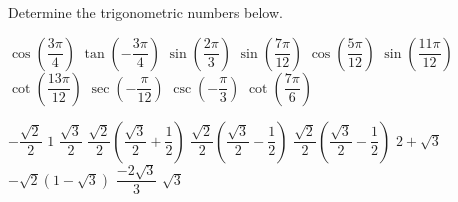 \begin{Exercise} Determine the trigonometric numbers below.
	\begin{multicols}{3}
	\Question[difficulty = 1] $\cos\left(\dfrac{3\pi}{4}\right)$
	\Question[difficulty = 1] $\tan\left(-\dfrac{3\pi}{4}\right)$
	\Question[difficulty = 1] $\sin\left(\dfrac{2\pi}{3}\right)$
	\Question[difficulty = 2] $\sin\left(\dfrac{7\pi}{12}\right)$
	\Question[difficulty = 2] $\cos\left(\dfrac{5\pi}{12}\right)$
	\Question[difficulty = 2] $\sin\left(\dfrac{11\pi}{12}\right)$
    \Question[difficulty = 2] $\cot \left(\dfrac{13\pi}{12}\right)$ 
    \Question[difficulty = 2] $\sec\left(-\dfrac{\pi}{12}\right)$ 
    \Question[difficulty = 1] $\csc\left(-\dfrac{\pi}{3}\right)$ 
    \Question[difficulty = 1] $\cot\left(\dfrac{7\pi}{6}\right)$ 
	\EndCurrentQuestion
	\end{multicols}
	
\end{Exercise}

\begin{Answer}\phantom{}
    \begin{multicols}{2}
	
	\Question $-\dfrac{\sqrt{2}}{2}$
	\Question $1$
	\Question $\dfrac{\sqrt{3}}{2}$
	\Question $\dfrac{\sqrt{2}}{2} \left(\dfrac{\sqrt{3}}{2} + \dfrac{1}{2} \right) $
	\Question $\dfrac{\sqrt{2}}{2} \left(\dfrac{\sqrt{3}}{2} - \dfrac{1}{2} \right)$
	\Question $\dfrac{\sqrt{2}}{2} \left(\dfrac{\sqrt{3}}{2} - \dfrac{1}{2} \right)$
	\Question $2 + \sqrt{3} $
	\Question $-\sqrt{2}\left( 1- \sqrt{3} \right) $ 
	\Question $\dfrac{-2\sqrt{3}}{3}$
	\Question $\sqrt{3}$
	\EndCurrentQuestion
	\end{multicols}
\end{Answer}



